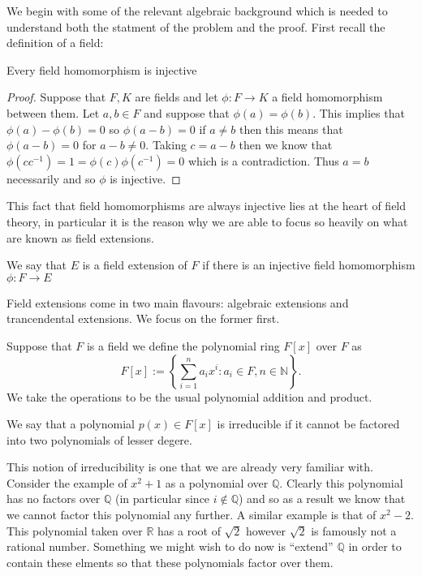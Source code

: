 We begin with some of the relevant algebraic background which is needed to
understand both the statment of the problem and the proof. First recall the
definition of a field:

\begin{propn}
  Every field homomorphism is injective 
\end{propn}
\begin{proof}
  Suppose that $F, K$ are fields and let $\phi: F \to K$ a field homomorphism
  between them. Let $a, b \in F$ and suppose that $\phi(a) = \phi(b)$. This
  implies that $\phi(a) - \phi(b) = 0$ so $\phi(a - b) = 0$ if $a \neq b$ then
  this means that $\phi(a-b) = 0$ for $a - b \neq 0$. Taking $c = a-b$ then we
  know that $\phi(cc^{-1}) = 1 = \phi(c)\phi(c^{-1}) = 0$ which is
  a contradiction. Thus $a = b$ necessarily and so $\phi$ is injective.
\end{proof}

This fact that field homomorphisms are always injective lies at the heart of
field theory, in particular it is the reason why we are able to focus so
heavily on what are known as field extensions. 

\begin{defn}
  We say that $E$ is a field extension of $F$ if there is an injective field
  homomorphism $\phi: F \to E$
\end{defn}

Field extensions come in two main flavours: algebraic extensions and
trancendental extensions. We focus on the former first.

\begin{defn}
  Suppose that $F$ is a field we define the polynomial ring  $F[x]$ over $F$ as
  \[
    F[x] := \left\{\sum_{i=1}^{n}a_{i}x^{i}: a_{i} \in F, n \in
    \mathbb{N}\right\} 
  .\]
  We take the operations to be the usual polynomial addition and product.
\end{defn}

\begin{defn}[Irreducible]
  We say that a polynomial $p(x) \in F[x]$ is irreducible if it cannot be
  factored into two polynomials of lesser degere.
\end{defn}

This notion of irreducibility is one that we are already very familiar with.
Consider the example of $x^2 + 1$ as a polynomial over $\mathbb{Q}$. Clearly
this polynomial has no factors over $\mathbb{Q}$ (in particular since $i
\not\in \mathbb{Q}$) and so as a result we know
that we cannot factor this polynomial any further. A similar example is that of
$x^2 - 2$. This polynomial taken over $\mathbb{R}$ has a root of $\sqrt{2}$
however $\sqrt{2}$ is famously not a rational number. Something we might wish
to do now is ``extend'' $\mathbb{Q}$ in order to contain these elments so that
these polynomials factor over them.

